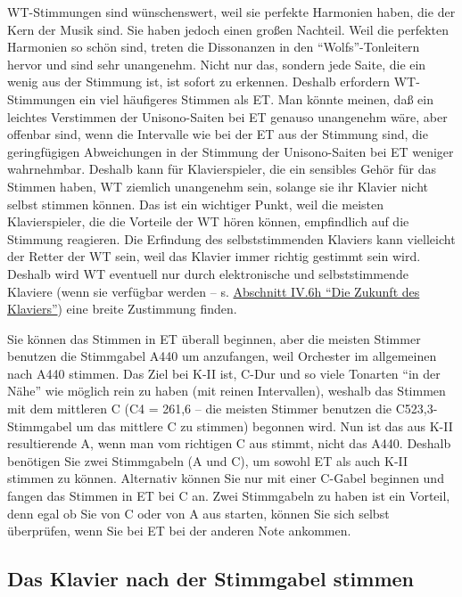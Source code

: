 WT-Stimmungen sind wünschenswert, weil sie perfekte Harmonien haben, die der Kern der Musik sind.
Sie haben jedoch einen großen Nachteil.
Weil die perfekten Harmonien so schön sind, treten die Dissonanzen in den \enquote{Wolfs}-Tonleitern hervor und sind sehr unangenehm.
Nicht nur das, sondern jede Saite, die ein wenig aus der Stimmung ist, ist sofort zu erkennen.
Deshalb erfordern WT-Stimmungen ein viel häufigeres Stimmen als ET.
Man könnte meinen, daß ein leichtes Verstimmen der Unisono-Saiten bei ET genauso unangenehm wäre, aber offenbar sind, wenn die Intervalle wie bei der ET aus der Stimmung sind, die geringfügigen Abweichungen in der Stimmung der Unisono-Saiten bei ET weniger wahrnehmbar.
Deshalb kann für Klavierspieler, die ein sensibles Gehör für das Stimmen haben, WT ziemlich unangenehm sein, solange sie ihr Klavier nicht selbst stimmen können.
Das ist ein wichtiger Punkt, weil die meisten Klavierspieler, die die Vorteile der WT hören können, empfindlich auf die Stimmung reagieren.
Die Erfindung des selbststimmenden Klaviers kann vielleicht der Retter der WT sein, weil das Klavier immer richtig gestimmt sein wird.
Deshalb wird WT eventuell nur durch elektronische und selbststimmende Klaviere (wenn sie verfügbar werden -- s. \hyperref[c1iv6h]{Abschnitt IV.6h \enquote{Die Zukunft des Klaviers}}) eine breite Zustimmung finden.

Sie können das Stimmen in ET überall beginnen, aber die meisten Stimmer benutzen die Stimmgabel A440 um anzufangen, weil Orchester im allgemeinen nach A440 stimmen.
Das Ziel bei K-II ist, C-Dur und so viele Tonarten \enquote{in der Nähe} wie möglich rein zu haben (mit reinen Intervallen), weshalb das Stimmen mit dem mittleren C (C4 = 261,6 -- die meisten Stimmer benutzen die C523,3-Stimmgabel um das mittlere C zu stimmen) begonnen wird.
Nun ist das aus K-II resultierende A, wenn man vom richtigen C aus stimmt, nicht das A440.
Deshalb benötigen Sie zwei Stimmgabeln (A und C), um sowohl ET als auch K-II stimmen zu können.
Alternativ können Sie nur mit einer C-Gabel beginnen und fangen das Stimmen in ET bei C an.
Zwei Stimmgabeln zu haben ist ein Vorteil, denn egal ob Sie von C oder von A aus starten, können Sie sich selbst überprüfen, wenn Sie bei ET bei der anderen Note ankommen.


\label{c2_6b}
\subsection{Das Klavier nach der Stimmgabel stimmen}
\label{c2_6_gabe}

